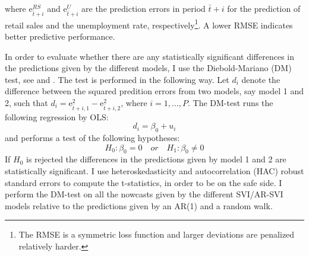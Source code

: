 \noindent where $\mathrm{e}_{\bar{t} + i}^{RS}$ and $\mathrm{e}_{\bar{t} + i}^U$ are the prediction errors in period $\bar{t} + i$ for the prediction of retail sales and the unemployment rate, respectively\footnote{The RMSE is a symmetric loss function and larger deviations are penalized relatively harder.}. A lower RMSE indicates better predictive performance.

In order to evaluate whether there are any statistically significant differences in the predictions given by the different models, I use the Diebold-Mariano (DM) test, see \textcite{diebold1995} and \textcite{west1996}. The test is performed in the following way. Let $d_{i}$ denote the difference between the squared predition errors from two models, say model 1 and 2, such that $d_i = \mathrm{e}_{\bar{t} + i, 1}^2 - \mathrm{e}_{\bar{t} + i, 2}^2$, where $i = 1, \ldots, P$. The DM-test runs the following regression by OLS:
\begin{equation}\label{dw_test}
	d_i = \beta_0 + u_i
\end{equation}
\noindent and performs a test of the following hypotheses:
\begin{equation}\label{hypotheses}
	H_0: \beta_0 = 0 \quad or \quad H_1: \beta_0 \neq 0
\end{equation}
\noindent If $H_0$ is rejected the differences in the predictions given by model 1 and 2 are statistically significant. I use heteroskedasticity and autocorrelation (HAC) robust standard errors to compute the t-statistics, in order to be on the safe side. I perform the DM-test on all the nowcasts given by the different SVI/AR-SVI models relative to the predictions given by an AR(1) and a random walk.